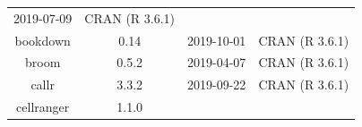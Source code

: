 \documentclass[11pt,]{book}
\begin{document}
\begin{longtable}[]{@{}cccc@{}}
\begin{minipage}[t]{0.16\columnwidth}
2019-07-09\strut
\end{minipage} & \begin{minipage}[t]{0.36\columnwidth}\centering\strut
CRAN (R 3.6.1)\strut
\end{minipage}\tabularnewline
\begin{minipage}[t]{0.18\columnwidth}\centering\strut
bookdown\strut
\end{minipage} & \begin{minipage}[t]{0.19\columnwidth}\centering\strut
0.14\strut
\end{minipage} & \begin{minipage}[t]{0.16\columnwidth}\centering\strut
2019-10-01\strut
\end{minipage} & \begin{minipage}[t]{0.36\columnwidth}\centering\strut
CRAN (R 3.6.1)\strut
\end{minipage}\tabularnewline
\begin{minipage}[t]{0.18\columnwidth}\centering\strut
broom\strut
\end{minipage} & \begin{minipage}[t]{0.19\columnwidth}\centering\strut
0.5.2\strut
\end{minipage} & \begin{minipage}[t]{0.16\columnwidth}\centering\strut
2019-04-07\strut
\end{minipage} & \begin{minipage}[t]{0.36\columnwidth}\centering\strut
CRAN (R 3.6.1)\strut
\end{minipage}\tabularnewline
\begin{minipage}[t]{0.18\columnwidth}\centering\strut
callr\strut
\end{minipage} & \begin{minipage}[t]{0.19\columnwidth}\centering\strut
3.3.2\strut
\end{minipage} & \begin{minipage}[t]{0.16\columnwidth}\centering\strut
2019-09-22\strut
\end{minipage} & \begin{minipage}[t]{0.36\columnwidth}\centering\strut
CRAN (R 3.6.1)\strut
\end{minipage}\tabularnewline
\begin{minipage}[t]{0.18\columnwidth}\centering\strut
cellranger\strut
\end{minipage} & \begin{minipage}[t]{0.19\columnwidth}\centering\strut
1.1.0\strut
\end{minipage} & \begin{minipage}[t]{0.16\columnwidth}\centering\strut

\end{minipage}
\end{longtable}
\end{document}
